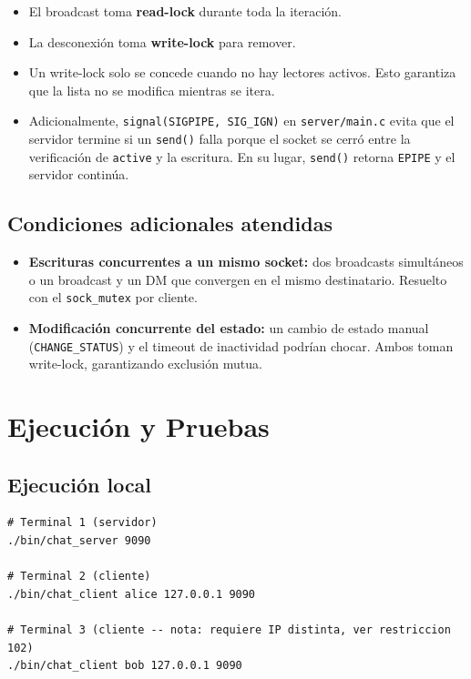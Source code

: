 \documentclass[12pt,a4paper]{article}
\begin{document}
\begin{itemize}[nosep]
    \item El broadcast toma \textbf{read-lock} durante toda la iteración.
    \item La desconexión toma \textbf{write-lock} para remover.
    \item Un write-lock solo se concede cuando no hay lectores activos.  Esto
          garantiza que la lista no se modifica mientras se itera.
    \item Adicionalmente, \texttt{signal(SIGPIPE, SIG\_IGN)} en \texttt{server/main.c}
          evita que el servidor termine si un \texttt{send()} falla porque el
          socket se cerró entre la verificación de \texttt{active} y la escritura.
          En su lugar, \texttt{send()} retorna \texttt{EPIPE} y el servidor
          continúa.
\end{itemize}

\subsection{Condiciones adicionales atendidas}

\begin{itemize}
    \item \textbf{Escrituras concurrentes a un mismo socket:} dos broadcasts
          simultáneos o un broadcast y un DM que convergen en el mismo
          destinatario.  Resuelto con el \texttt{sock\_mutex} por cliente.
    \item \textbf{Modificación concurrente del estado:} un cambio de estado manual
          (\texttt{CHANGE\_STATUS}) y el timeout de inactividad podrían chocar.
          Ambos toman write-lock, garantizando exclusión mutua.
\end{itemize}

\section{Ejecución y Pruebas}

\subsection{Ejecución local}

\begin{lstlisting}[style=protocol]
# Terminal 1 (servidor)
./bin/chat_server 9090

# Terminal 2 (cliente)
./bin/chat_client alice 127.0.0.1 9090

# Terminal 3 (cliente -- nota: requiere IP distinta, ver restriccion 102)
./bin/chat_client bob 127.0.0.1 9090
\end{lstlisting}
\end{document}
